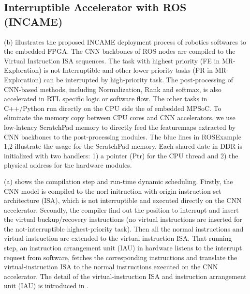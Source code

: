 \subsection{ Interruptible Accelerator with ROS (INCAME) }


(b) illustrates the proposed INCAME deployment process of robotics softwares to the embedded FPGA. 
The CNN backbones of ROS nodes are compiled to the Virtual Instruction ISA sequences. The task with highest priority (FE in MR-Exploration) is not Interruptible and other lower-priority tasks (PR in MR-Exploration) can be interrupted by high-priority task. The post-processing of CNN-based methods, including Normalization, Rank and softmax, is also accelerated in RTL specific logic or software flow. The other tasks in C++/Python run directly on the CPU side the of embedded MPSoC\cite{MPSoC}. To eliminate the memory copy between CPU cores and CNN accelerators, we use low-latency ScratchPad memory \cite{Banakar2002Scratchpad} to directly feed the featuremaps extracted by CNN backbones to the post-processing modules. The blue lines in  ROSExample 1,2 illustrate the usage for the ScratchPad memory. Each shared date in DDR is initialized with two handlers: 1) a pointer (Ptr) for the CPU thread and 2) the physical address for the hardware modules.

(a) shows the compilation step and run-time dynamic scheduling. Firstly, the CNN model is compiled to the norl initruction with origin instruction set architecture (ISA), which is not interruptible and executed directly on the CNN accelerator. Secondly, the compiler find out the position to interrupt and insert the virtual buckup/recovery instructions (no virtual instructions are inserted for the not-interruptible highest-priority task). Then all the normal instructions and virtual instruction are extended to the virtual instruction ISA. That running step, an instruction arrangement unit (IAU) in hardware listens to the interrupt request from software, fetches the corresponding instructions and translate the virtual-instruction ISA to the normal instructions executed on the CNN accelerator. The detail of the virtual-instruction ISA and instruction arrangement unit (IAU) is introduced in .

